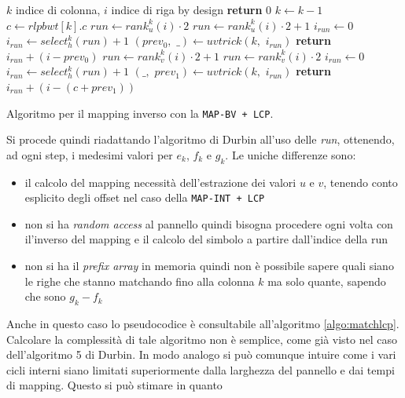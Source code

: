 \begin{algorithm}
  \begin{algorithmic}[1]
    \Comment $k$ indice di colonna, $i$ indice di riga
    \Comment by design
    \State \textbf{return} $0$
    \EndIf
    \State $k\gets k-1$
    \State $c\gets rlpbwt[k].c$
    \State $run\gets rank_u^{k}(i)\cdot 2$
    \Else
    \State $run\gets rank_u^{k}(i)\cdot 2+1$
    \EndIf
    \State $i_{run}\gets 0$
    \State $i_{run}\gets select_h^{k}(run)+1$
    \EndIf
    \State $(prev_0,\,\,\_)\gets uvtrick(k,\,\,i_{run})$
    \State \textbf{return} $i_{run}+(i-prev_0)$
    \Else
    \State $run\gets rank_v^{k}(i)\cdot 2+1$
    \Else
    \State $run\gets rank_v^{k}(i)\cdot 2$
    \EndIf
    \State $i_{run}\gets 0$
    \State $i_{run}\gets select_h^{k}(run)+1$
    \EndIf
    \State $(\_,\,\,prev_1)\gets uvtrick(k,\,\,i_{run})$
    \State \textbf{return} $i_{run}+(i-(c+prev_1))$
    \EndIf
    \EndFunction
  \end{algorithmic}
  \caption{Algoritmo per il mapping inverso con la \texttt{MAP-BV + LCP}.}
  \label{algo:lfrevbv}
\end{algorithm}
Si procede quindi riadattando l'algoritmo di Durbin all'uso delle \textit{run},
ottenendo, ad ogni step, i medesimi valori per $e_k$, $f_k$ e $g_k$. Le uniche
differenze sono:
\begin{itemize}
  \item il calcolo del mapping necessità dell'estrazione dei valori $u$ e $v$,
  tenendo conto esplicito degli offset nel caso della \texttt{MAP-INT + LCP}
  \item non si ha \textit{random access} al pannello quindi bisogna procedere
  ogni volta con il'inverso del mapping e il calcolo del simbolo a partire
  dall'indice della run
  \item non si ha il \textit{prefix array} in memoria quindi non è possibile
  sapere quali siano le righe che stanno matchando fino alla colonna $k$ ma solo
  quante, sapendo che sono $g_k-f_k$
\end{itemize}
Anche in questo caso lo pseudocodice è consultabile all'algoritmo
\ref{algo:matchlcp}. Calcolare la complessità di tale algoritmo non è semplice,
come già visto nel caso dell'algoritmo 5 di Durbin. In modo analogo si può
comunque intuire come i vari cicli interni siano limitati superiormente dalla
larghezza del pannello e dai tempi di mapping. Questo si può stimare in quanto
